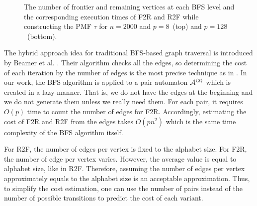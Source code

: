 \begin{figure}[ht]
{	}
	\caption{The number of frontier and remaining vertices at each BFS level and the corresponding execution times of F2R and R2F while constructing the PMF $\tau$ for $n = 2000$ and $p = 8$~(top) and $p=128$~(bottom).}
	
	\label{fig:BFS-vtcomparison}
\end{figure}

The hybrid approach idea for traditional BFS-based graph traversal is introduced by Beamer et al. \cite{Beamer}. Their algorithm checks all the edges, so determining the cost of each iteration by the number of edges is the most precise technique as in \cite{Beamer}. In our work, the BFS algorithm is applied to a pair automaton ${\cal A}^{\langle 2 \rangle}$ which is created in a lazy-manner. That is, we do not have the edges at the beginning and we do not generate them unless we really need them. For each pair, it requires $O(p)$ time to count the number of edges for F2R. Accordingly, estimating the cost of F2R and R2F from the edges takes $O(pn^2)$ which is the same time complexity of the BFS algorithm itself. 

For R2F, the number of edges per vertex is fixed to  the alphabet size. For F2R, the number of edge per vertex varies. However, the average value is equal to alphabet size, like in R2F. Therefore, assuming the number of edges per vertex approximately equals to the alphabet size is an acceptable approximation. Thus, to simplify the cost estimation, one can use the number of pairs instead of the number of possible transitions to predict the cost of each variant.

